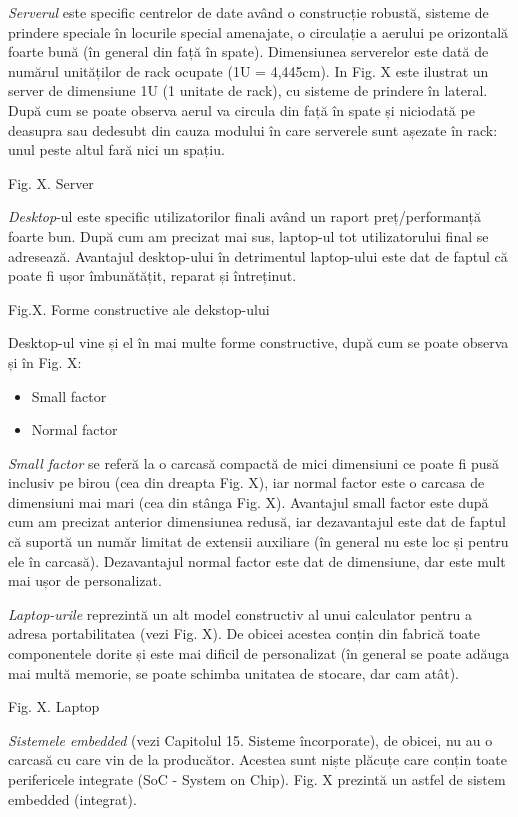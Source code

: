 \textit{Serverul} este specific centrelor de date având o construcție robustă, sisteme de
prindere speciale în locurile special amenajate, o circulație a aerului pe
orizontală foarte bună (în general din față în spate). Dimensiunea serverelor
este dată de numărul unităților de rack ocupate (1U = 4,445cm). In Fig. X este
ilustrat un server de dimensiune 1U (1 unitate de rack), cu sisteme de prindere
în lateral. După cum se poate observa aerul va circula din față în spate și
niciodată pe deasupra sau dedesubt din cauza modului în care serverele sunt
așezate în rack: unul peste altul fară nici un spațiu.

Fig. X. Server

\textit{Desktop}-ul este specific utilizatorilor finali având un raport preț/performanță
foarte bun. După cum am precizat mai sus, laptop-ul tot utilizatorului final se
adresează. Avantajul desktop-ului în detrimentul laptop-ului este dat de faptul
că poate fi ușor îmbunătățit, reparat și întreținut.

Fig.X. Forme constructive ale dekstop-ului

Desktop-ul vine și el în mai multe forme constructive, după cum se poate observa și în Fig. X:

\begin{itemize}
	\item Small factor
	\item Normal factor
\end{itemize}

\textit{Small factor} se referă la o carcasă compactă de mici dimensiuni ce poate fi pusă
inclusiv pe birou (cea din dreapta Fig. X), iar normal factor este o carcasa de
dimensiuni mai mari (cea din stânga Fig. X). Avantajul small factor este după
cum am precizat anterior dimensiunea redusă, iar dezavantajul este dat de faptul
că suportă un număr limitat de extensii auxiliare (în general nu este loc și
pentru ele în carcasă). Dezavantajul normal factor este dat de dimensiune, dar
este mult mai ușor de personalizat.

\textit{Laptop-urile} reprezintă un alt model constructiv al unui calculator pentru a
adresa portabilitatea (vezi Fig. X). De obicei acestea conțin din fabrică toate
componentele dorite și este mai dificil de personalizat (în general se poate
adăuga mai multă memorie, se poate schimba unitatea de stocare, dar cam atât).

Fig. X. Laptop

\textit{Sistemele embedded} (vezi Capitolul 15. Sisteme încorporate), de obicei, nu au o
carcasă cu care vin de la producător. Acestea sunt niște plăcuțe care conțin
toate perifericele integrate (SoC - System on Chip). Fig. X prezintă un astfel
de sistem embedded (integrat).

